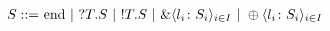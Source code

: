 \begin{align*}
 S \bnf\ & \mbox{\lstinline{end}} \alt \inpt{T}{S} \alt \outpt{T}{S} \alt
    \Branch{l_i}{S_i}{i\in I} \alt \Choice{l_i}{S_i}{i\in I}
\end{align*}
